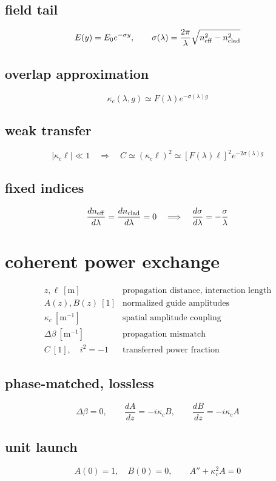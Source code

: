 \documentclass[11pt]{article}
\begin{document}
\subsection*{field tail}
\[
\displaystyle E(y)=E_0e^{-\sigma y},\qquad\sigma(\lambda)=\frac{2\pi}{\lambda}\sqrt{n_{\rm eff}^2-n_{\rm clad}^2}
\]
\subsection*{overlap approximation}
\[
\displaystyle \kappa_c(\lambda,g)\simeq F(\lambda)e^{-\sigma(\lambda)g}
\]
\subsection*{weak transfer}
\[
\displaystyle |\kappa_c\ell|\ll1\quad\Longrightarrow\quad C\simeq(\kappa_c\ell)^2\simeq[F(\lambda)\ell]^2e^{-2\sigma(\lambda)g}
\]
\subsection*{fixed indices}
\[
\displaystyle \frac{dn_{\rm eff}}{d\lambda}=\frac{dn_{\rm clad}}{d\lambda}=0\quad\Longrightarrow\quad\frac{d\sigma}{d\lambda}=-\frac{\sigma}{\lambda}
\]

\clearpage
\section*{coherent power exchange}
\[
\begin{array}{ll}z,\ell\ [\mathrm m]&\text{propagation distance, interaction length}\\[0.6em]A(z),B(z)\ [1]&\text{normalized guide amplitudes}\\[0.6em]\kappa_c\ [\mathrm{m^{-1}}]&\text{spatial amplitude coupling}\\[0.6em]\Delta\beta\ [\mathrm{m^{-1}}]&\text{propagation mismatch}\\[0.6em]C\ [1],\quad i^2=-1&\text{transferred power fraction}\end{array}
\]
\subsection*{phase-matched, lossless}
\[
\displaystyle \Delta\beta=0,\qquad\frac{dA}{dz}=-i\kappa_c B,\qquad\frac{dB}{dz}=-i\kappa_c A
\]
\subsection*{unit launch}
\[
\displaystyle A(0)=1,\quad B(0)=0,\qquad A''+\kappa_c^2A=0
\]
\end{document}
